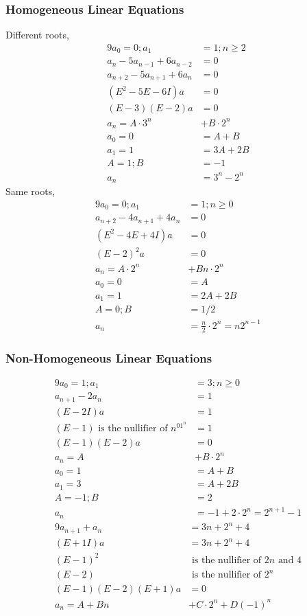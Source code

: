 \subsubsection{Homogeneous Linear Equations}
Different roots,
\begin{alignat*}{9}
a_{0} = 0; a_{1} &= 1; n\geq 2 \\
a_{n} - 5a_{n-1} + 6a_{n-2} &= 0 \\
a_{n+2} - 5a_{n+1} + 6a_{n} &= 0 \\
(E^2 - 5E - 6I)a &= 0 \\
(E-3)(E-2)a &= 0 \\
a_n = A\cdot 3^n &+ B\cdot 2^n \\
a_0 = 0 &= A + B \\
a_1 = 1 &= 3A + 2B \\
A = 1; B &= -1 \\
a_n &= 3^n - 2^n
\end{alignat*}
Same roots,
\begin{alignat*}{9}
a_{0} = 0; a_{1} &= 1; n\geq 0 \\
a_{n+2} - 4a_{n+1} + 4a_{n} &= 0 \\
(E^2 - 4E + 4I)a &= 0 \\
(E-2)^2a &= 0 \\
a_n = A\cdot 2^n &+ Bn\cdot 2^n \\
a_0 = 0 &= A \\
a_1 = 1 &= 2A + 2B \\
A = 0; B &= 1/2 \\
a_n &= \frac{n}{2} \cdot 2^n = n2^{n-1}
\end{alignat*}

\subsubsection{Non-Homogeneous Linear Equations}
\begin{alignat*}{9}
a_{0} = 1; a_{1} &= 3; n\geq 0 \\
a_{n+1} - 2a_{n} &= 1 \\
(E - 2I)a &= 1 \\
(E-1) \text{ is the nullifier of } n^01^n &= 1 \\
(E-1)(E-2)a &= 0 \\
a_n = A &+ B\cdot 2^n \\
a_0 = 1 &= A + B \\
a_1 = 3 &= A + 2B \\
A = -1; B &= 2 \\
a_n &= -1 + 2\cdot 2^n = 2^{n+1} - 1
\end{alignat*}
\begin{alignat*}{9}
a_{n+1} + a_{n} &= 3n + 2^n + 4 \\
(E + 1I)a &= 3n + 2^n + 4 \\
(E-1)^2 &\text{ is the nullifier of } 2n \text{ and } 4 \\
(E-2) &\text{ is the nullifier of } 2^n \\
(E-1)(E-2)(E+1)a &= 0 \\
a_n = A + Bn &+ C\cdot 2^n + D(-1)^n \\
\end{alignat*}

